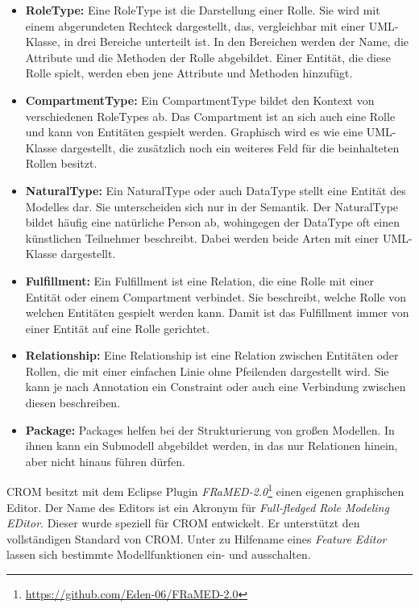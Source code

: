 \begin{itemize}
    \item \textbf{RoleType:}
    Eine RoleType ist die Darstellung einer Rolle.
    Sie wird mit einem abgerundeten Rechteck dargestellt, das, vergleichbar mit einer UML-Klasse, in drei Bereiche unterteilt ist.
    In den Bereichen werden der Name, die Attribute und die Methoden der Rolle abgebildet.
    Einer Entität, die diese Rolle spielt, werden eben jene Attribute und Methoden hinzufügt.
    \item \textbf{CompartmentType:}
    Ein CompartmentType bildet den Kontext von verschiedenen RoleTypes ab.
    Das Compartment ist an sich auch eine Rolle und kann von Entitäten gespielt werden.
    Graphisch wird es wie eine UML-Klasse dargestellt, die zusätzlich noch ein weiteres Feld für die beinhalteten Rollen besitzt.
    \item \textbf{NaturalType:}
    Ein NaturalType oder auch DataType stellt eine Entität des Modelles dar.
    Sie unterscheiden sich nur in der Semantik.
    Der NaturalType bildet häufig eine natürliche Person ab, wohingegen der DataType oft einen künstlichen Teilnehmer beschreibt.
    Dabei werden beide Arten mit einer UML-Klasse dargestellt. 
    \item \textbf{Fulfillment:}
    Ein Fulfillment ist eine Relation, die eine Rolle mit einer Entität oder einem Compartment verbindet.
    Sie beschreibt, welche Rolle von welchen Entitäten gespielt werden kann.
    Damit ist das Fulfillment immer von einer Entität auf eine Rolle gerichtet.
    \item \textbf{Relationship:}
    Eine Relationship ist eine Relation zwischen Entitäten oder Rollen, die mit einer einfachen Linie ohne Pfeilenden dargestellt wird.
    Sie kann je nach Annotation ein Constraint oder auch eine Verbindung zwischen diesen beschreiben.
    \item \textbf{Package:}
    Packages helfen bei der Strukturierung von großen Modellen.
    In ihnen kann ein Submodell abgebildet werden, in das nur Relationen hinein, aber nicht hinaus führen dürfen.
\end{itemize}

CROM besitzt mit dem Eclipse Plugin \emph{FRaMED-2.0}\footnote{\url{https://github.com/Eden-06/FRaMED-2.0}} einen eigenen graphischen Editor.
Der Name des Editors ist ein Akronym für \emph{Full-fledged Role Modeling EDitor}. 
Dieser wurde speziell für CROM entwickelt.
Er unterstützt den vollständigen Standard von CROM.
Unter zu Hilfename eines \emph{Feature Editor} lassen sich bestimmte Modellfunktionen ein- und ausschalten.

